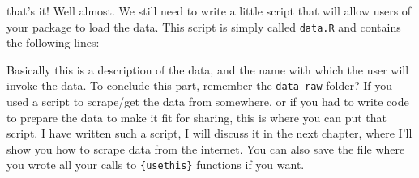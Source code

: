 \documentclass[
]{article}
\newenvironment{Shaded}{\begin{snugshade}}{\end{snugshade}}
\newcommand{\CommentTok}[1]{\textcolor[rgb]{0.56,0.35,0.01}{\textit{#1}}}
\newcommand{\StringTok}[1]{\textcolor[rgb]{0.31,0.60,0.02}{#1}}
\begin{document}
that's it! Well almost. We still need to write a little script that will allow users of your
package to load the data. This script is simply called \texttt{data.R} and contains the following lines:

\begin{Shaded}
\end{Shaded}

Basically this is a description of the data, and the name with which the user will invoke the data. To
conclude this part, remember the \texttt{data-raw} folder? If you used a script to scrape/get the data
from somewhere, or if you had to write code to prepare the data to make it fit for sharing, this
is where you can put that script. I have written such a script, I will discuss it in the next
chapter, where I'll show you how to scrape data from the internet. You can also save the file
where you wrote all your calls to \texttt{\{usethis\}} functions if you want.
\end{document}
